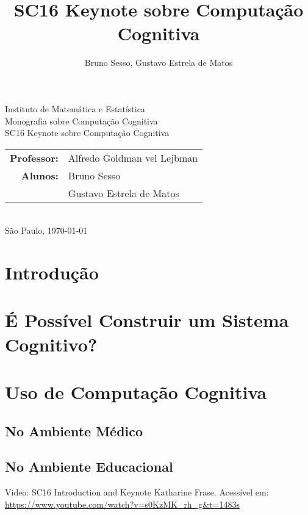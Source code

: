 \documentclass[12pt]{article}
\title{SC16 Keynote sobre Computação Cognitiva}
\author{Bruno Sesso, Gustavo Estrela de Matos}
\begin{document}
\doublespacing
\begin{titlepage}
    \vfill
    \begin{center}
        \vspace{0.5\textheight}
        \noindent
        Instituto de Matemática e Estatística \\
        Monografia sobre Computação Cognitiva \\
        \vfill
        \noindent
        {\Large SC16 Keynote sobre Computação Cognitiva} \\
        \begin{tabular}{rl}
            {\bf Professor:} & {Alfredo Goldman vel Lejbman} \\
            {\bf Alunos:}    & {Bruno Sesso} \\
                             & {Gustavo Estrela de Matos} \\
        \end{tabular} \\
        \vspace{\fill}
       \bigskip
        São Paulo, \today \\
       \bigskip
    \end{center}
\end{titlepage}

\pagebreak
\tableofcontents
\pagebreak

\section{Introdução}


\pagebreak
\section{É Possível Construir um Sistema Cognitivo?}

\pagebreak
\section{Uso de Computação Cognitiva}
\subsection{No Ambiente Médico}
\subsection{No Ambiente Educacional}


\pagebreak
\begin{thebibliography}{1}
 Video: SC16 Introduction and Keynote
    Katharine Frase. Acessível em: 
    \url{https://www.youtube.com/watch?v=s0KzMK_rh_g&t=1483s}
\end{thebibliography}
\end{document}
